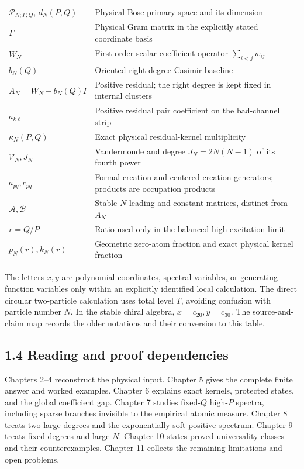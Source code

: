\begin{longtable}[]{@{}
  >{\raggedright\arraybackslash}p{}
  >{\raggedright\arraybackslash}p{}@{}}
\(\mathcal P_{N;P,Q}\), \(d_N(P,Q)\) & Physical Bose-primary space and its dimension \\
\(\Gamma\) & Physical Gram matrix in the explicitly stated coordinate basis \\
\(W_N\) & First-order scalar coefficient operator \(\sum_{i<j}w_{ij}\) \\
\(b_N(Q)\) & Oriented right-degree Casimir baseline \\
\(A_N=W_N-b_N(Q)I\) & Positive residual; the right degree is kept fixed in internal clusters \\
\(a_{k\ell}\) & Positive residual pair coefficient on the bad-channel strip \\
\(\kappa_N(P,Q)\) & Exact physical residual-kernel multiplicity \\
\(\mathcal V_N,J_N\) & Vandermonde and degree \(J_N=2N(N-1)\) of its fourth power \\
\(a_{pq},c_{pq}\) & Formal creation and centered creation generators; products are occupation products \\
\(\mathscr A,\mathscr B\) & Stable-\(N\) leading and constant matrices, distinct from \(A_N\) \\
\(r=Q/P\) & Ratio used only in the balanced high-excitation limit \\
\(p_N(r),k_N(r)\) & Geometric zero-atom fraction and exact physical kernel fraction \\
\end{longtable}

The letters \(x,y\) are polynomial coordinates, spectral variables, or generating-function variables only within an explicitly identified local calculation. The direct circular two-particle calculation uses total level \(T\), avoiding confusion with particle number \(N\). In the stable chiral algebra, \(x=c_{20},y=c_{30}\). The source-and-claim map records the older notations and their conversion to this table.

\hypertarget{reading-and-proof-dependencies}{%
\subsection{1.4 Reading and proof dependencies}\label{reading-and-proof-dependencies}}

Chapters 2--4 reconstruct the physical input. Chapter 5 gives the complete finite answer and worked examples. Chapter 6 explains exact kernels, protected states, and the global coefficient gap. Chapter 7 studies fixed-\(Q\) high-\(P\) spectra, including sparse branches invisible to the empirical atomic measure. Chapter 8 treats two large degrees and the exponentially soft positive spectrum. Chapter 9 treats fixed degrees and large \(N\). Chapter 10 states proved universality classes and their counterexamples. Chapter 11 collects the remaining limitations and open problems.

